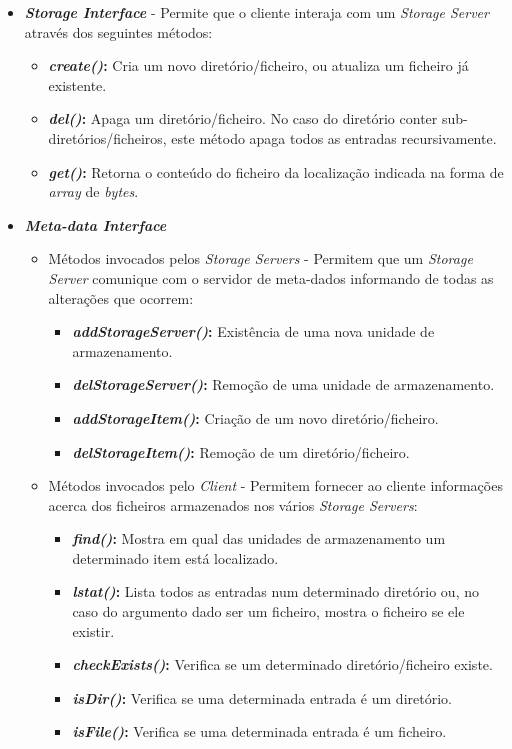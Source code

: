 \documentclass{article}
\begin{document}
\begin{itemize}
\item \textbf{\textit{Storage Interface}} - Permite que o cliente interaja com um \textit{Storage Server} através dos seguintes métodos:
	\begin{itemize}
		\item \textbf{\textit{create()}:} Cria um novo diretório/ficheiro, ou atualiza um ficheiro já existente.
		\item \textbf{\textit{del()}:} Apaga um diretório/ficheiro. No caso do diretório conter sub-diretórios/ficheiros, este método apaga todos as entradas recursivamente.
		\item \textbf{\textit{get()}:} Retorna o conteúdo do ficheiro da localização indicada na forma de \textit{array} de \textit{bytes}.
	\end{itemize}
\item \textbf{\textit{Meta-data Interface}}
	\begin{itemize}
		\item Métodos invocados pelos \textit{Storage Servers} - Permitem que um \textit{Storage Server} comunique com o servidor de meta-dados informando de todas as alterações que ocorrem:
		\begin{itemize}
			\item \textbf{\textit{addStorageServer()}:} Existência de uma nova unidade de armazenamento.
			\item \textbf{\textit{delStorageServer()}:} Remoção de uma unidade de armazenamento. 
			\item \textbf{\textit{addStorageItem()}:} Criação de um novo diretório/ficheiro.
			\item \textbf{\textit{delStorageItem()}:} Remoção de um diretório/ficheiro.
		\end{itemize}
		\item Métodos invocados pelo \textit{Client} - Permitem fornecer ao cliente informações acerca dos ficheiros armazenados nos vários \textit{Storage Servers}:
		\begin{itemize}
			\item \textbf{\textit{find()}:} Mostra em qual das unidades de armazenamento um determinado item está localizado.
			\item \textbf{\textit{lstat()}:} Lista todos as entradas num determinado diretório ou, no caso do argumento dado ser um ficheiro, mostra o ficheiro se ele existir.
			\item \textbf{\textit{checkExists()}:} Verifica se um determinado diretório/ficheiro existe.
			\item \textbf{\textit{isDir()}:} Verifica se uma determinada entrada é um diretório.
			\item \textbf{\textit{isFile()}:} Verifica se uma determinada entrada é um ficheiro.
		\end{itemize}
	\end{itemize}
\end{itemize}
\end{document}
